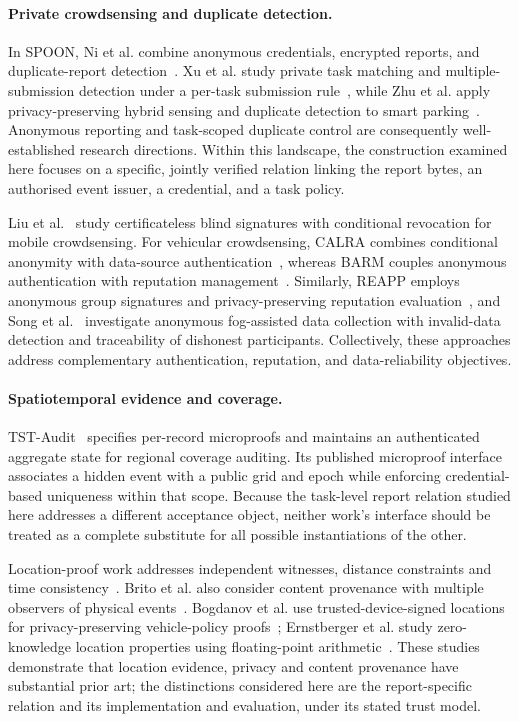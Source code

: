 \documentclass[pdflatex,iicol,sn-mathphys-num]{sn-jnl}
\begin{document}
\paragraph{Private crowdsensing and duplicate detection.} In SPOON, Ni et al. combine anonymous credentials, encrypted reports, and duplicate-report detection~\citep{Ni2020SPOON}. Xu et al. study private task matching and multiple-submission detection under a per-task submission rule~\citep{Xu2021TaskMatching}, while Zhu et al. apply privacy-preserving hybrid sensing and duplicate detection to smart parking~\citep{Zhu2022HybridSensing}. Anonymous reporting and task-scoped duplicate control are consequently well-established research directions. Within this landscape, the construction examined here focuses on a specific, jointly verified relation linking the report bytes, an authorised event issuer, a credential, and a task policy.

Liu et al.~\citep{Liu2024ConditionalBlind} study certificateless blind signatures with conditional revocation for mobile crowdsensing. For vehicular crowdsensing, CALRA combines conditional anonymity with data-source authentication~\citep{Xiao2025CALRA}, whereas BARM couples anonymous authentication with reputation management~\citep{Zheng2025BARM}. Similarly, REAPP employs anonymous group signatures and privacy-preserving reputation evaluation~\citep{Li2025REAPP}, and Song et al.~\citep{Song2026FogAnonymous} investigate anonymous fog-assisted data collection with invalid-data detection and traceability of dishonest participants. Collectively, these approaches address complementary authentication, reputation, and data-reliability objectives.

\paragraph{Spatiotemporal evidence and coverage.} TST-Audit~\citep{He2026TSTAudit} specifies per-record microproofs and maintains an authenticated aggregate state for regional coverage auditing. Its published microproof interface associates a hidden event with a public grid and epoch while enforcing credential-based uniqueness within that scope. Because the task-level report relation studied here addresses a different acceptance object, neither work's interface should be treated as a complete substitute for all possible instantiations of the other.

Location-proof work addresses independent witnesses, distance constraints and time consistency~\citep{Brito2025DecentralizedPoL}. Brito et al. also consider content provenance with multiple observers of physical events~\citep{Brito2026ContentProvenance}. Bogdanov et al. use trusted-device-signed locations for privacy-preserving vehicle-policy proofs~\citep{Bogdanov2025VehiclePolicy}; Ernstberger et al. study zero-knowledge location properties using floating-point arithmetic~\citep{Ernstberger2025ZKLP}. These studies demonstrate that location evidence, privacy and content provenance have substantial prior art; the distinctions considered here are the report-specific relation and its implementation and evaluation, under its stated trust model.
\end{document}
